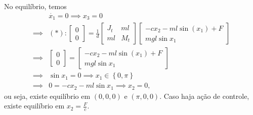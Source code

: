 \documentclass[a4paper]{report}
\begin{document}

No equilíbrio, temos
\begin{align*}
    & \dot{x_1} = 0 \implies x_3 = 0 \\
    \implies &(*): \begin{bmatrix} 0\\0 \end{bmatrix} = \frac{1}{d}\begin{bmatrix} J_t & ml \\ ml & M_t \end{bmatrix} \begin{bmatrix} 
    -cx_2 -ml\sin(x_1) + F \\
    mgl\sin x_1
\end{bmatrix}  \\
    \implies & \begin{bmatrix} 0 \\ 0 \end{bmatrix} = \begin{bmatrix} 
    -cx_2 -ml\sin(x_1) + F \\
    mgl\sin x_1
\end{bmatrix} \\
    \implies & \sin x_1 = 0 \implies x_1 \in \left\{ 0, \pi \right\} \\
    \implies & 0 = -cx_2 -ml\sin x_1 \implies x_2 = 0
,\end{align*} ou seja, existe equilíbrio em $(0,0,0)$ e $(\pi,0,0)$. Caso haja ação de controle, existe equilíbrio em $x_2 = \frac{F}{c}$.
\end{document}

